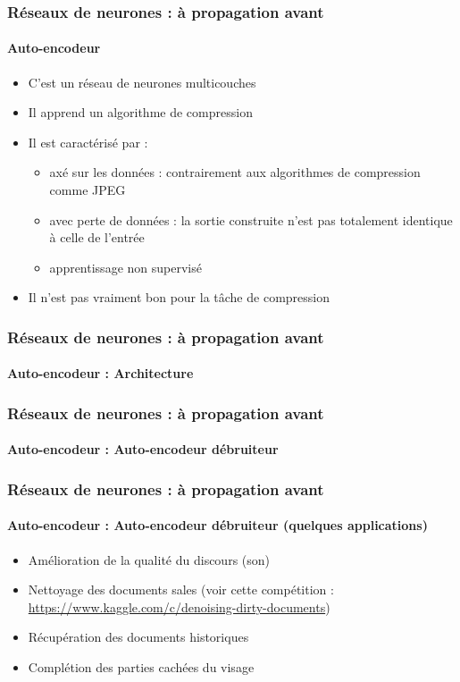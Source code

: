 \documentclass[xcolor=table]{beamer}
\begin{document}
\begin{frame}
\frametitle{Réseaux de neurones : à propagation avant}
\framesubtitle{Auto-encodeur}

\begin{itemize}
	\item C'est un réseau de neurones multicouches
	\item Il apprend un algorithme de compression
	\item Il est caractérisé par \cite{2016-keras} :
	\begin{itemize}
		\item axé sur les données : contrairement aux algorithmes de compression comme JPEG
		\item avec perte de données : la sortie construite n'est pas totalement identique à celle de l'entrée
		\item apprentissage non supervisé 
	\end{itemize}
	\item Il n'est pas vraiment bon pour la tâche de compression 
\end{itemize}

\end{frame}

\begin{frame}
\frametitle{Réseaux de neurones : à propagation avant}
\framesubtitle{Auto-encodeur : Architecture}


\end{frame}

\begin{frame}
\frametitle{Réseaux de neurones : à propagation avant}
\framesubtitle{Auto-encodeur : Auto-encodeur débruiteur}


\end{frame}

\begin{frame}
\frametitle{Réseaux de neurones : à propagation avant}
\framesubtitle{Auto-encodeur : Auto-encodeur débruiteur (quelques applications)}

\begin{itemize}
	\item Amélioration de la qualité du discours (son) \cite{2013-lu}
	\item Nettoyage des documents sales (voir cette compétition : \url{https://www.kaggle.com/c/denoising-dirty-documents})
	\item Récupération des documents historiques \cite{2019-neji}
	\item Complétion des parties cachées du visage \cite{2017-li-al}
\end{itemize}

\end{frame}
\end{document}
